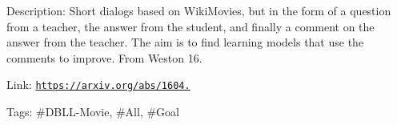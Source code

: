 Description\+: Short dialogs based on Wiki\+Movies, but in the form of a question from a teacher, the answer from the student, and finally a comment on the answer from the teacher. The aim is to find learning models that use the comments to improve. From Weston \textquotesingle{}16.

Link\+: \href{https://arxiv.org/abs/1604.06045}{\tt https\+://arxiv.\+org/abs/1604.}

Tags\+: \#\+D\+B\+LL-\/\+Movie, \#\+All, \#\+Goal 